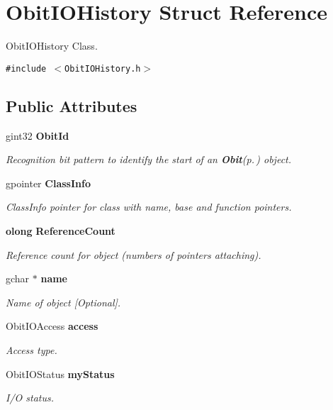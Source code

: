 \section{Obit\-IOHistory Struct Reference}
\label{structObitIOHistory}
Obit\-IOHistory Class.  


{\tt \#include $<$Obit\-IOHistory.h$>$}

\subsection*{Public Attributes}
\begin{CompactItemize}
\item 
gint32 {\bf Obit\-Id}
\begin{CompactList}\small\item\em Recognition bit pattern to identify the start of an {\bf Obit}{\rm (p.\,\pageref{structObit})} object. \item\end{CompactList}\item 
gpointer {\bf Class\-Info}
\begin{CompactList}\small\item\em Class\-Info pointer for class with name, base and function pointers. \item\end{CompactList}\item 
{\bf olong} {\bf Reference\-Count}
\begin{CompactList}\small\item\em Reference count for object (numbers of pointers attaching). \item\end{CompactList}\item 
gchar $\ast$ {\bf name}
\begin{CompactList}\small\item\em Name of object [Optional]. \item\end{CompactList}\item 
Obit\-IOAccess {\bf access}
\begin{CompactList}\small\item\em Access type. \item\end{CompactList}\item 
Obit\-IOStatus {\bf my\-Status}
\begin{CompactList}\small\item\em I/O status. \item\end{CompactList}\item 

\end{CompactItemize}
